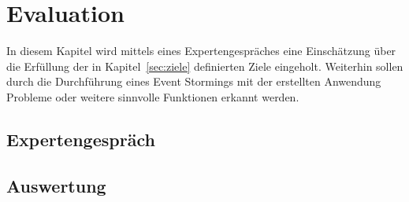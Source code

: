 \chapter{Evaluation}\label{ch:evaluation}
In diesem Kapitel wird mittels eines Expertengespräches eine Einschätzung über die Erfüllung der in
Kapitel~\ref{sec:ziele} definierten Ziele eingeholt.
Weiterhin sollen durch die Durchführung eines Event Stormings mit der erstellten Anwendung Probleme oder weitere sinnvolle
Funktionen erkannt werden.

\section{Expertengespräch}\label{sec:expertengespraech}

\section{Auswertung}\label{sec:auswertung}
